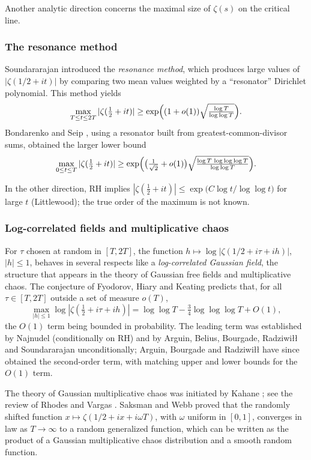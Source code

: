 \documentclass[11pt]{amsart}
\theoremstyle{definition}
\theoremstyle{remark}
\begin{document}
Another analytic direction concerns the maximal size of $\zeta(s)$ on the critical line.

\subsubsection{The resonance method}

Soundararajan \cite{soundararajan2008} introduced the \emph{resonance method}, which produces large values of $|\zeta(1/2 + it)|$ by comparing two mean values weighted by a ``resonator'' Dirichlet polynomial. This method yields
\[
\max_{T\le t\le 2T}|\zeta(\tfrac12+it)|\ge\exp\Bigl((1+o(1))\sqrt{\tfrac{\log T}{\log\log T}}\Bigr).
\]
Bondarenko and Seip \cite{bondarenko2017}, using a resonator built from greatest-common-divisor sums, obtained the larger lower bound
\[
\max_{0\le t\le T}|\zeta(\tfrac12+it)|\ge\exp\Bigl(\bigl(\tfrac1{\sqrt2}+o(1)\bigr)\sqrt{\tfrac{\log T\,\log\log\log T}{\log\log T}}\Bigr).
\]

In the other direction, RH implies $|\zeta(\tfrac12+it)|\le\exp\bigl(C\log t/\log\log t\bigr)$ for large $t$ (Littlewood); the true order of the maximum is not known.

\subsubsection{Log-correlated fields and multiplicative chaos}

For $\tau$ chosen at random in $[T,2T]$, the function $h\mapsto\log|\zeta(1/2 + i\tau+ih)|$, $|h|\le 1$, behaves in several respects like a \emph{log-correlated Gaussian field}, the structure that appears in the theory of Gaussian free fields and multiplicative chaos. The conjecture of Fyodorov, Hiary and Keating \cite{fyodorov2012} predicts that, for all $\tau\in[T,2T]$ outside a set of measure $o(T)$,
\[
\max_{|h|\le1}\log|\zeta(\tfrac12+i\tau+ih)|=\log\log T-\tfrac34\log\log\log T+O(1),
\]
the $O(1)$ term being bounded in probability. The leading term was established by Najnudel \cite{najnudel2018} (conditionally on RH) and by Arguin, Belius, Bourgade, Radziwi\l\l{} and Soundararajan \cite{abbrs2019} unconditionally; Arguin, Bourgade and Radziwi\l\l{} \cite{abr1,abr2} have since obtained the second-order term, with matching upper and lower bounds for the $O(1)$ term.

The theory of Gaussian multiplicative chaos was initiated by Kahane \cite{kahane1985}; see the review of Rhodes and Vargas \cite{rhodes2014}. Saksman and Webb \cite{saksman2020} proved that the randomly shifted function $x\mapsto\zeta(1/2+ix+i\omega T)$, with $\omega$ uniform in $[0,1]$, converges in law as $T\to\infty$ to a random generalized function, which can be written as the product of a Gaussian multiplicative chaos distribution and a smooth random function.
\end{document}
